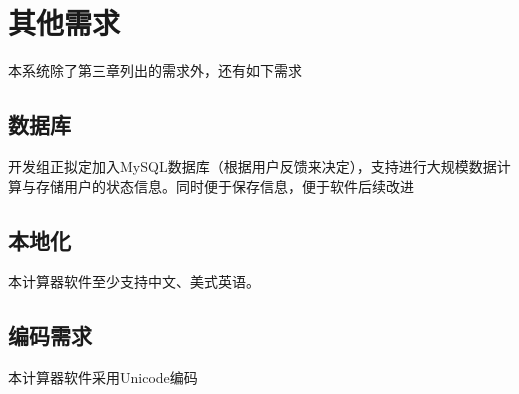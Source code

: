 \chapter{其他需求}

本系统除了第三章列出的需求外，还有如下需求

\section{数据库}

开发组正拟定加入MySQL数据库（根据用户反馈来决定），支持进行大规模数据计算与存储用户的状态信息。同时便于保存信息，便于软件后续改进

\section{本地化}

本计算器软件至少支持中文、美式英语。

\section{编码需求}

本计算器软件采用Unicode编码